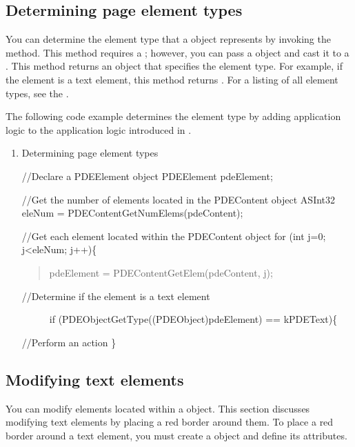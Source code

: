 \documentclass[letterpaper,12pt,english,openany,oneside]{sphinxmanual}
\begin{document}
\subsection{Determining page element types}
\label{\detokenize{Plugins_Pages:determining-page-element-types}}
You can determine the element type that a  object represents by invoking the  method. This method requires a  ; however, you can pass a  object and cast it to a . This method returns an  object that specifies the element type. For example, if the element is a text element, this method returns . For a listing of all element types, see the .

The following code example determines the element type by adding application logic to the application logic introduced in .
\begin{enumerate}
%
\item {} 
Determining page element types

//Declare a PDEElement object
PDEElement pdeElement;

//Get the number of elements located in the PDEContent object
ASInt32 eleNum =  PDEContentGetNumElems(pdeContent);

//Get each element located within the PDEContent object
for (int j=0; j<eleNum; j++)\{
\begin{quote}

pdeElement = PDEContentGetElem(pdeContent, j);
\end{quote}
\begin{description}
\item[{//Determine if the element is a text element}] \leavevmode
if (PDEObjectGetType((PDEObject)pdeElement) == kPDEText)\{

\end{description}

//Perform an action
\}

\end{enumerate}


\subsection{Modifying text elements}
\label{\detokenize{Plugins_Pages:modifying-text-elements}}
You can modify elements located within a  object. This section discusses modifying text elements by placing a red border around them. To place a red border around a text element, you must create a  object and define its attributes.
\end{document}

